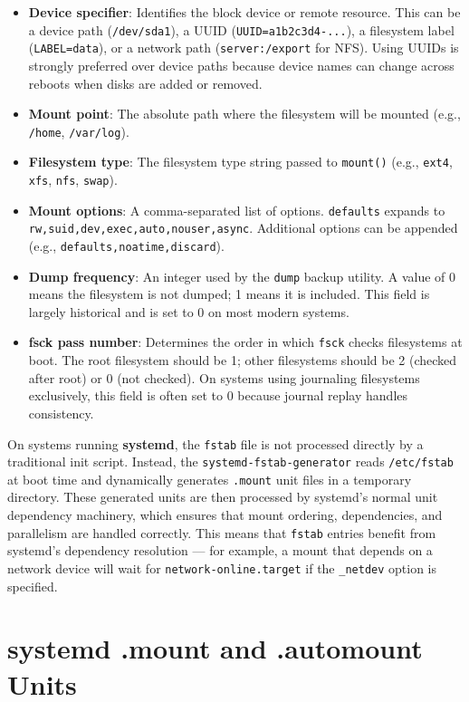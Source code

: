 \begin{itemize}
  \item \textbf{Device specifier}: Identifies the block device or remote resource. This can be a device path (\texttt{/dev/sda1}), a UUID (\texttt{UUID=a1b2c3d4-...}), a filesystem label (\texttt{LABEL=data}), or a network path (\texttt{server:/export} for NFS). Using UUIDs is strongly preferred over device paths because device names can change across reboots when disks are added or removed.
  \item \textbf{Mount point}: The absolute path where the filesystem will be mounted (e.g., \texttt{/home}, \texttt{/var/log}).
  \item \textbf{Filesystem type}: The filesystem type string passed to \texttt{mount()} (e.g., \texttt{ext4}, \texttt{xfs}, \texttt{nfs}, \texttt{swap}).
  \item \textbf{Mount options}: A comma-separated list of options. \texttt{defaults} expands to \texttt{rw,suid,dev,exec,auto,nouser,async}. Additional options can be appended (e.g., \texttt{defaults,noatime,discard}).
  \item \textbf{Dump frequency}: An integer used by the \texttt{dump} backup utility. A value of 0 means the filesystem is not dumped; 1 means it is included. This field is largely historical and is set to 0 on most modern systems.
  \item \textbf{fsck pass number}: Determines the order in which \texttt{fsck} checks filesystems at boot. The root filesystem should be 1; other filesystems should be 2 (checked after root) or 0 (not checked). On systems using journaling filesystems exclusively, this field is often set to 0 because journal replay handles consistency.
\end{itemize}

On systems running \textbf{systemd}, the \texttt{fstab} file is not processed directly by a traditional init script. Instead, the \texttt{systemd-fstab-generator} reads \texttt{/etc/fstab} at boot time and dynamically generates \texttt{.mount} unit files in a temporary directory. These generated units are then processed by systemd's normal unit dependency machinery, which ensures that mount ordering, dependencies, and parallelism are handled correctly. This means that \texttt{fstab} entries benefit from systemd's dependency resolution --- for example, a mount that depends on a network device will wait for \texttt{network-online.target} if the \texttt{\_netdev} option is specified.

\section{systemd .mount and .automount Units}

